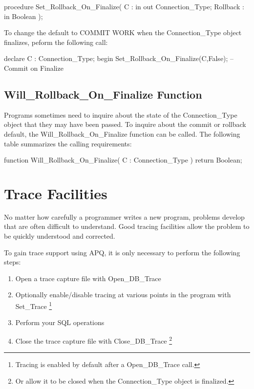 \documentclass[english,letterpaper]{book}
\begin{document}
\begin{Code}
procedure Set_Rollback_On_Finalize(
   C :        in out Connection_Type;
   Rollback : in     Boolean
);
\end{Code}

To change the default to COMMIT WORK when the Connection\_Type object
finalizes, peform the following call:

\begin{Example}
declare
   C : Connection_Type;
begin
   Set_Rollback_On_Finalize(C,False); -- Commit on Finalize
\end{Example}

\subsection{Will\_Rollback\_On\_Finalize Function\label{Will_Rollback_On_Finalize Function}}

Programs sometimes need to inquire about the state of the Connection\_Type
object that they may have been passed. To inquire about the commit
or rollback default, the Will\_Rollback\_On\_Finalize function can
be called. The following table summarizes the calling requirements:

\begin{Code}
function Will_Rollback_On_Finalize(
   C : Connection_Type
) return Boolean;
\end{Code}

\section{Trace Facilities\label{Trace Facilities}}

No matter how carefully a programmer writes a new program, problems
develop that are often difficult to understand. Good tracing facilities
allow the problem to be quickly understood and corrected.

To gain trace support using APQ, it is only necessary to perform the
following steps:

\begin{enumerate}
   \item Open a trace capture file with Open\_DB\_Trace
   \item Optionally enable/disable tracing at various points in the program
      with Set\_Trace%
      \footnote{Tracing is enabled by default after a Open\_DB\_Trace call.}
   \item Perform your SQL operations
   \item Close the trace capture file with Close\_DB\_Trace%
      \footnote{Or allow it to be closed when the Connection\_Type object is finalized.}
\end{enumerate}
\end{document}
